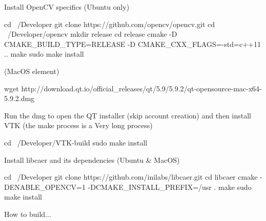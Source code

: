 Install Open\+CV specifics (Ubuntu only) 
\begin{DoxyCode}
cd ~/Developer
git clone https://github.com/opencv/opencv.git
cd ~/Developer/opencv
mkdir release
cd release
cmake -D CMAKE\_BUILD\_TYPE=RELEASE -D CMAKE\_CXX\_FLAGS=-std=c++11 ..
make
sudo make install
\end{DoxyCode}


(Mac\+OS element) 
\begin{DoxyCode}
wget http://download.qt.io/official\_releases/qt/5.9/5.9.2/qt-opensource-mac-x64-5.9.2.dmg
\end{DoxyCode}
 Run the dmg to open the QT installer (skip account creation) and then install V\+TK (the make process is a Very long process) 
\begin{DoxyCode}
cd ~/Developer/VTK-build
sudo make install
\end{DoxyCode}


Install libcaer and its dependencies (Ubuntu \& Mac\+OS)


\begin{DoxyCode}
cd ~/Developer
git clone https://github.com/inilabs/libcaer.git
cd libcaer
cmake -DENABLE\_OPENCV=1 -DCMAKE\_INSTALL\_PREFIX=/usr .
make
sudo make install
\end{DoxyCode}


How to build... 